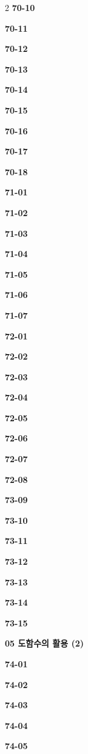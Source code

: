 \documentclass[10pt,a4paper]{article}
\begin{document}
\begin{multicols}{2}
\noindent\textbf{70-10}\ \par
\noindent\textbf{70-11}\ \par
\noindent\textbf{70-12}\ \par
\noindent\textbf{70-13}\ \par
\noindent\textbf{70-14}\ \par
\noindent\textbf{70-15}\ \par
\noindent\textbf{70-16}\ \par
\noindent\textbf{70-17}\ \par
\noindent\textbf{70-18}\ \par
\noindent\textbf{71-01}\ \par
\noindent\textbf{71-02}\ \par
\noindent\textbf{71-03}\ \par
\noindent\textbf{71-04}\ \par
\noindent\textbf{71-05}\ \par
\noindent\textbf{71-06}\ \par
\noindent\textbf{71-07}\ \par
\noindent\textbf{72-01}\ \par
\noindent\textbf{72-02}\ \par
\noindent\textbf{72-03}\ \par
\noindent\textbf{72-04}\ \par
\noindent\textbf{72-05}\ \par
\noindent\textbf{72-06}\ \par
\noindent\textbf{72-07}\ \par
\noindent\textbf{72-08}\ \par
\noindent\textbf{73-09}\ \par
\noindent\textbf{73-10}\ \par
\noindent\textbf{73-11}\ \par
\noindent\textbf{73-12}\ \par
\noindent\textbf{73-13}\ \par
\noindent\textbf{73-14}\ \par
\noindent\textbf{73-15}\ \par
\noindent\textbf{05 도함수의 활용 (2)}\par\smallskip
\noindent\textbf{74-01}\ \par
\noindent\textbf{74-02}\ \par
\noindent\textbf{74-03}\ \par
\noindent\textbf{74-04}\ \par
\noindent\textbf{74-05}\ \par

\end{multicols}
\end{document}
